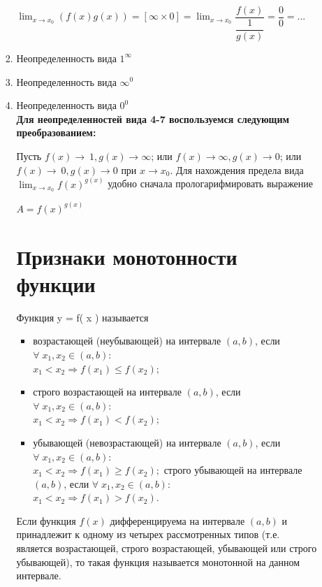 \documentclass[oneside]{book}
\begin{document}
\begin{enumerate}
\begin{itemize}
\begin{enumerate}
	$\lim_{x \to x_{0}} (f(x)g(x))=
	[\infty\times 0]=
	\lim_{x \to x_{0}} \dfrac{f(x)}{\dfrac{1}{g(x)}}=
	\dfrac{0}{0}=...$

	\item Неопределенность вида $1^{\infty}$
	\item Неопределенность вида $\infty^{0}$
	\item Неопределенность вида $0^{0}$\\

	\textbf{Для неопределенностей вида 4-7 воспользуемся следующим преобразованием:}

	Пусть $f(x)\to\ 1, g(x)\to\infty$; или $f(x)\to\infty, g(x)\to 0$; или $f(x)\to\ 0, g(x)\to 0$ при $x\to x_{0}$. Для нахождения предела вида $\lim_{x\to x_{0}} f(x)^{g(x)}$ удобно сначала прологарифмировать выражение
	 \begin{center}
		$A=f(x)^{g(x)}$
	\end{center}

  \setcounter{chapter}{25}         

\setcounter{chapter}{26}         
\chapter{Признаки монотонности функции}         

Функция y = f\left( x \right) называется \\ 
\begin{itemize}
    \item возрастающей (неубывающей) на интервале $\left( {a,b} \right)$, если
    ${\forall\;{x_1},{x_2} \in \left( {a,b} \right):\;}$\\
    ${{x_1} < {x_2} \Rightarrow f\left( {{x_1}} \right) \leq f\left( {{x_2}} \right);}$
    \item строго возрастающей на интервале $\left( {a,b} \right)$, если
    ${\forall\;{x_1},{x_2} \in \left( {a,b} \right):\;}$\\
    ${{x_1} < {x_2} \Rightarrow f\left( {{x_1}} \right) \lt f\left( {{x_2}} \right);}$
    \item убывающей (невозрастающей) на интервале $\left( {a,b} \right)$, если
    ${\forall\;{x_1},{x_2} \in \left( {a,b} \right):\;}$\\
    ${{x_1} < {x_2} \Rightarrow f\left( {{x_1}} \right) \ge f\left( {{x_2}} \right);}$
    строго убывающей на интервале $\left( {a,b} \right)$, если
    ${\forall\;{x_1},{x_2} \in \left( {a,b} \right):\;}$\\
    ${{x_1} < {x_2} \Rightarrow f\left( {{x_1}} \right) \gt f\left( {{x_2}} \right).}$
\end{itemize}
Если функция $f\left( x \right)$ дифференцируема на интервале $\left( {a,b} \right)$ и принадлежит к одному из четырех рассмотренных типов
(т.е. является возрастающей, строго возрастающей, убывающей или строго убывающей), то такая функция называется монотонной на данном интервале. 
\setcounter{chapter}{27}         


\end{enumerate}
\end{itemize}
\end{enumerate}
\end{document}
